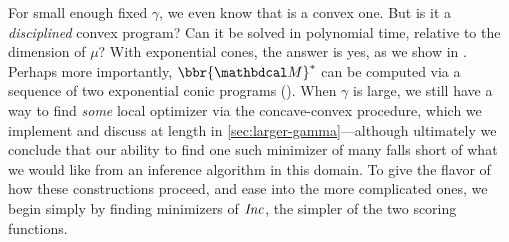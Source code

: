 \documentclass[twoside]{article}
\newcommand\obslimit{observational surrogate} %
\begin{document}
For small enough fixed $\gamma$, we even know that is a convex one. 
But is it a \emph{disciplined} convex program? Can it be solved in polynomial time, relative to the dimension of $\mu$? 
%
%
With exponential cones, the answer is yes, as we show in . 
Perhaps more importantly, 
$\bbr{\dg M}^*$ can be computed via a sequence of two exponential conic programs (). 
When $\gamma$ is large, we still have a way to find \emph{some} local optimizer via the concave-convex procedure, which we implement and discuss at length in \cref{sec:larger-gamma}---although ultimately we conclude that our ability to find one such minimizer of many falls short of what we would like from an inference algorithm in this domain.
To give the flavor of how these constructions proceed, and ease into the more complicated ones, we begin simply by finding minimizers of $\mathit{Inc}$, the simpler of the two scoring functions.
\end{document}
